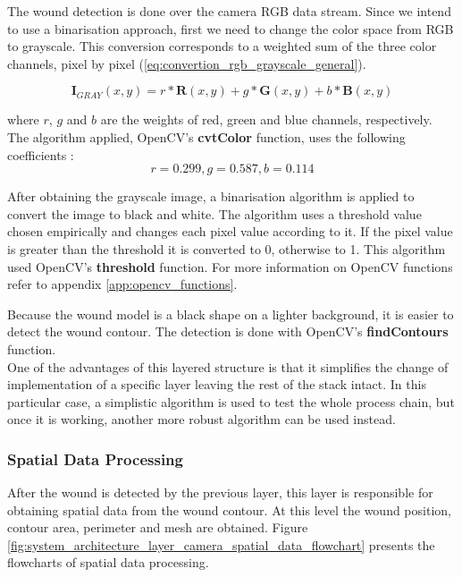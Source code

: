 The wound detection is done over the camera RGB data stream. Since we intend to use a binarisation approach, first we need to change the color space from RGB to grayscale. This conversion corresponds to a weighted sum of the three color channels, pixel by pixel (\ref{eq:convertion_rgb_grayscale_general}).

\begin{equation}
\boldsymbol{I}_{GRAY}(x,y) = r * \boldsymbol{R}(x,y) + g * \boldsymbol{G}(x,y) + b * \boldsymbol{B}(x,y)
\label{eq:convertion_rgb_grayscale_general}
\end{equation}

where $r$, $g$ and $b$ are the weights of red, green and blue channels, respectively. The algorithm applied,  OpenCV's \textbf{cvtColor} function, uses the following coefficients \cite{OpenCV2020_color_conversions, ITU2020_grayscale_conversion}: 
$$ r = 0.299, g = 0.587, b = 0.114 $$

After obtaining the grayscale image, a binarisation algorithm is applied to convert the image to black and white. The algorithm uses a threshold value chosen empirically and changes each pixel value according to it. If the pixel value is greater than the threshold it is converted to 0, otherwise to 1. This algorithm used OpenCV's \textbf{threshold} function. For more information on OpenCV functions refer to appendix \ref{app:opencv_functions}.

Because the wound model is a black shape on a lighter background, it is easier to detect the wound contour. The detection is done with OpenCV's \textbf{findContours} function.\\

One of the advantages of this layered structure is that it simplifies the change of implementation of a specific layer leaving the rest of the stack intact. In this particular case, a simplistic algorithm is used to test the whole process chain, but once it is working, another more robust algorithm can be used instead.


\subsubsection*{Spatial Data Processing}
\label{subsubsec:system_architectural_camera_layers_spatial_data}

After the wound is detected by the previous layer, this layer is responsible for obtaining spatial data from the wound contour. At this level the wound position, contour area, perimeter and mesh are obtained. Figure \ref{fig:system_architecture_layer_camera_spatial_data_flowchart} presents the flowcharts of spatial data processing.

